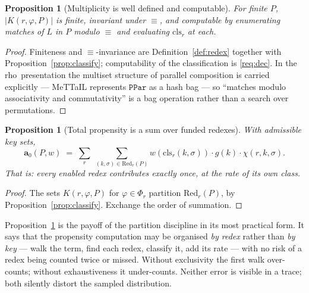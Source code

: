 \documentclass[11pt,a4paper]{article}
\theoremstyle{plain}
\newtheorem{proposition}[theorem]{Proposition}
\theoremstyle{definition}
\theoremstyle{remark}
\newcommand{\rhoc}{\textsf{rho}}
\newcommand{\Red}{\mathrm{Red}}
\newcommand{\prop}{\mathbf{a}}
\newcommand{\wmap}{w}
\newcommand{\gfac}{g}
\newcommand{\class}{\mathrm{cls}}
\begin{document}
\begin{proposition}[Multiplicity is well defined and computable]
\label{prop:multiplicity}
For finite $P$, $|K(r,\varphi,P)|$ is finite, invariant under $\equiv$, and computable by enumerating
matches of $L$ in $P$ modulo $\equiv$ and evaluating $\class_r$ at each.
\end{proposition}

\begin{proof}
Finiteness and $\equiv$-invariance are Definition~\ref{def:redex} together with
Proposition~\ref{prop:classify}; computability of the classification is \ref{req:dec}. In the \rhoc\
presentation the multiset structure of parallel composition is carried explicitly --- MeTTaIL
represents $\texttt{PPar}$ as a hash bag \cite{mettail} --- so ``matches modulo associativity and
commutativity'' is a bag operation rather than a search over permutations.
\end{proof}

\begin{proposition}[Total propensity is a sum over funded redexes]
\label{prop:total}
With admissible key sets,
\[
\prop_0(P,\wmap) \;=\; \sum_{r}\;\sum_{(k,\sigma)\in\Red_r(P)} \wmap(\class_r(k,\sigma))\cdot\gfac(k)\cdot\chi(r,k,\sigma).
\]
That is: every enabled redex contributes exactly once, at the rate of its own class.
\end{proposition}

\begin{proof}
The sets $K(r,\varphi,P)$ for $\varphi \in \Phi_r$ partition $\Red_r(P)$, by
Proposition~\ref{prop:classify}. Exchange the order of summation.
\end{proof}

Proposition~\ref{prop:total} is the payoff of the partition discipline in its most practical form.
It says that the propensity computation may be organised \emph{by redex} rather than \emph{by key} ---
walk the term, find each redex, classify it, add its rate --- with no risk of a redex being counted
twice or missed. Without exclusivity the first walk over-counts; without exhaustiveness it
under-counts. Neither error is visible in a trace; both silently distort the sampled distribution.
\end{document}
